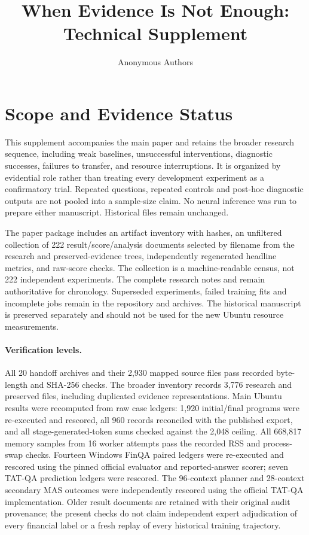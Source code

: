 \documentclass[letterpaper]{article}
\title{When Evidence Is Not Enough: Technical Supplement}
\author{Anonymous Authors}
\date{}
\begin{document}
\maketitle
\tableofcontents
\clearpage
\section{Scope and Evidence Status}
This supplement accompanies the main paper and retains the broader research sequence, including weak baselines, unsuccessful interventions, diagnostic successes, failures to transfer, and resource interruptions. It is organized by evidential role rather than treating every development experiment as a confirmatory trial. Repeated questions, repeated controls and post-hoc diagnostic outputs are not pooled into a sample-size claim. No neural inference was run to prepare either manuscript. Historical files remain unchanged.

The paper package includes an artifact inventory with hashes, an unfiltered collection of 222 result/score/analysis documents selected by filename from the research and preserved-evidence trees, independently regenerated headline metrics, and raw-score checks. The collection is a machine-readable census, not 222 independent experiments. The complete research notes and  remain authoritative for chronology. Superseded experiments, failed training fits and incomplete jobs remain in the repository and archives. The historical manuscript is preserved separately and should not be used for the new Ubuntu resource measurements.

\paragraph{Verification levels.}
All 20 handoff archives and their 2,930 mapped source files pass recorded byte-length and SHA-256 checks. The broader inventory records 3,776 research and preserved files, including duplicated evidence representations. Main Ubuntu results were recomputed from raw case ledgers: 1,920 initial/final programs were re-executed and rescored, all 960 records reconciled with the published export, and all stage-generated-token sums checked against the 2,048 ceiling. All 668,817 memory samples from 16 worker attempts pass the recorded RSS and process-swap checks. Fourteen Windows FinQA paired ledgers were re-executed and rescored using the pinned official evaluator and reported-answer scorer; seven TAT-QA prediction ledgers were rescored. The 96-context planner and 28-context secondary MAS outcomes were independently rescored using the official TAT-QA implementation. Older result documents are retained with their original audit provenance; the present checks do not claim independent expert adjudication of every financial label or a fresh replay of every historical training trajectory.
\end{document}
